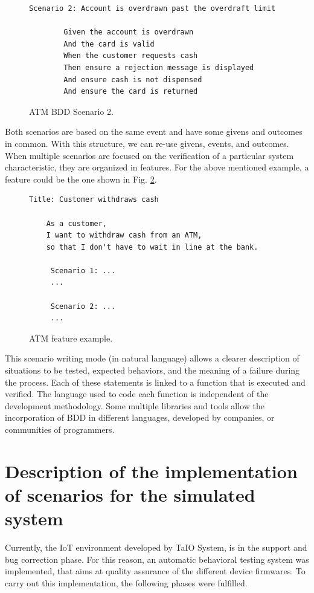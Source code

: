 \documentclass[journal]{IEEEtran}	%
\begin{document}
\begin{figure}[t]
\centering
\begin{lstlisting}[]
    Scenario 2: Account is overdrawn past the overdraft limit

        Given the account is overdrawn
        And the card is valid
        When the customer requests cash
        Then ensure a rejection message is displayed
        And ensure cash is not dispensed
        And ensure the card is returned
\end{lstlisting}
\caption{ATM BDD Scenario 2.}
\label{fig:ATMscenario2}
\end{figure}

Both scenarios are based on the same event and have some givens and outcomes in common. With this structure, we can re-use givens, events, and outcomes. When multiple scenarios are focused on the verification of a particular system characteristic, they are organized in features. For the above mentioned example, a feature could be the one shown in Fig. \ref{fig:ATMfeature}.

\begin{figure}[t!]
\centering
\begin{lstlisting}[]
   Title: Customer withdraws cash
    
    As a customer,
    I want to withdraw cash from an ATM,
    so that I don't have to wait in line at the bank.
    
     Scenario 1: ...
     ...
    
     Scenario 2: ...
     ...
\end{lstlisting}
\caption{ATM feature example.}
\label{fig:ATMfeature}
\end{figure}

This scenario writing mode (in natural language) allows a clearer description of situations to be tested, expected behaviors, and the meaning of a failure during the process. Each of these statements is linked to a function that is executed and verified. The language used to code each function is independent of the development methodology. Some multiple libraries and tools allow the incorporation of BDD in different languages, developed by companies, or communities of programmers.


\section{Description of the implementation of scenarios for the simulated system}


Currently, the IoT environment developed by TaIO System, is in the support and bug correction phase. For this reason, an automatic behavioral testing system was implemented, that aims at quality assurance of the different device firmwares. To carry out this implementation, the following phases were fulfilled.
\end{document}
